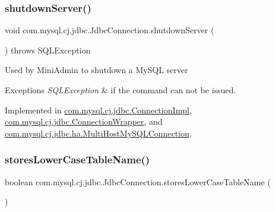 \subsubsection{\texorpdfstring{shutdown\+Server()}{shutdownServer()}}
{\footnotesize\ttfamily void com.\+mysql.\+cj.\+jdbc.\+Jdbc\+Connection.\+shutdown\+Server (\begin{DoxyParamCaption}{ }\end{DoxyParamCaption}) throws S\+Q\+L\+Exception}

Used by Mini\+Admin to shutdown a My\+S\+QL server


\begin{DoxyExceptions}{Exceptions}
{\em S\+Q\+L\+Exception} & if the command can not be issued. \\
\hline
\end{DoxyExceptions}


Implemented in \mbox{\hyperlink{classcom_1_1mysql_1_1cj_1_1jdbc_1_1_connection_impl_ad33978512e58f5bb84875219ffd8af41}{com.\+mysql.\+cj.\+jdbc.\+Connection\+Impl}}, \mbox{\hyperlink{classcom_1_1mysql_1_1cj_1_1jdbc_1_1_connection_wrapper_a0989b3c99444046219ef68a1e15863c9}{com.\+mysql.\+cj.\+jdbc.\+Connection\+Wrapper}}, and \mbox{\hyperlink{classcom_1_1mysql_1_1cj_1_1jdbc_1_1ha_1_1_multi_host_my_s_q_l_connection_a33803a0494610eb6148a4d8c1c9b046a}{com.\+mysql.\+cj.\+jdbc.\+ha.\+Multi\+Host\+My\+S\+Q\+L\+Connection}}.

\mbox{\label{interfacecom_1_1mysql_1_1cj_1_1jdbc_1_1_jdbc_connection_a6a1919361434e33f3de8410b87dab6e1}} 
\subsubsection{\texorpdfstring{stores\+Lower\+Case\+Table\+Name()}{storesLowerCaseTableName()}}
{\footnotesize\ttfamily boolean com.\+mysql.\+cj.\+jdbc.\+Jdbc\+Connection.\+stores\+Lower\+Case\+Table\+Name (\begin{DoxyParamCaption}{ }\end{DoxyParamCaption})}



